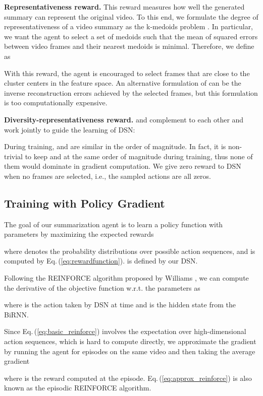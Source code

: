 \documentclass[letterpaper]{article} \usepackage{aaai18}  \usepackage{times}  \usepackage{helvet}  \usepackage{courier}  \usepackage{url}  \usepackage{graphicx}
\begin{document}
{\bf Representativeness reward.} This reward measures how well the generated summary can represent the original video. To this end, we formulate the degree of representativeness of a video summary as the k-medoids problem \cite{gygli2015video}. In particular, we want the agent to select a set of medoids such that the mean of squared errors between video frames and their nearest medoids is minimal. Therefore, we define  as


With this reward, the agent is encouraged to select frames that are close to the cluster centers in the feature space. An alternative formulation of  can be the inverse reconstruction errors achieved by the selected frames, but this formulation is too computationally expensive.

{\bf Diversity-representativeness reward.}  and  complement to each other and work jointly to guide the learning of DSN:


During training,  and  are similar in the order of magnitude. In fact, it is non-trivial to keep  and  at the same order of magnitude during training, thus none of them would dominate in gradient computation. We give zero reward to DSN when no frames are selected, i.e., the sampled actions are all zeros.

\subsection{Training with Policy Gradient}
The goal of our summarization agent is to learn a policy function  with parameters  by maximizing the expected rewards

where  denotes the probability distributions over possible action sequences, and  is computed by Eq.\,(\ref{eq:rewardfunction}).  is defined by our DSN.

Following the REINFORCE algorithm proposed by Williams \cite{williams1992simple}, we can compute the derivative of the objective function  w.r.t. the parameters  as

where  is the action taken by DSN at time  and  is the hidden state from the BiRNN.

Since Eq.\,(\ref{eq:basic_reinforce}) involves the expectation over high-dimensional action sequences, which is hard to compute directly, we approximate the gradient by running the agent for  episodes on the same video and then taking the average gradient

where  is the reward computed at the  episode. Eq.\,(\ref{eq:approx_reinforce}) is also known as the episodic REINFORCE algorithm.
\end{document}
